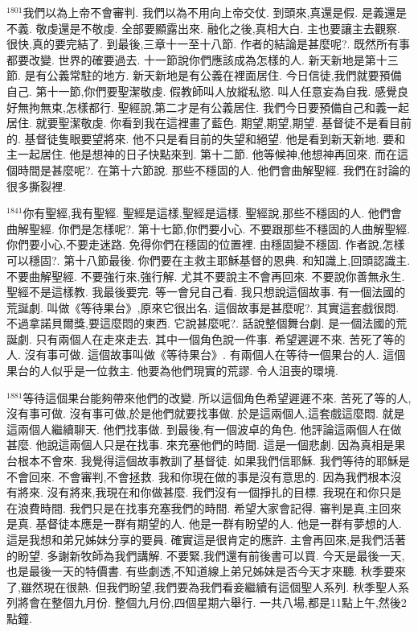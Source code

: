 \documentclass{book}
\begin{document}
$^{1801}$我們以為上帝不會審判.
我們以為不用向上帝交仗.
到頭來,真還是假.
是義還是不義.
敬虔還是不敬虔.
全部要顯露出來.
融化之後,真相大白.
主也要讓主去觀察.
很快,真的要完結了.
到最後,三章十一至十八節.
作者的結論是甚麼呢?.
既然所有事都要改變.
世界的確要過去.
十一節說你們應該成為怎樣的人.
新天新地是第十三節.
是有公義常駐的地方.
新天新地是有公義在裡面居住.
今日信徒,我們就要預備自己.
第十一節,你們要聖潔敬虔.
假教師叫人放縱私慾.
叫人任意妄為自我.
感覺良好無拘無束,怎樣都行.
聖經說,第二才是有公義居住.
我們今日要預備自己和義一起居住.
就要聖潔敬虔.
你看到我在這裡畫了藍色.
期望,期望,期望.
基督徒不是看目前的.
基督徒隻眼要望將來.
他不只是看目前的失望和絕望.
他是看到新天新地.
要和主一起居住.
他是想神的日子快點來到.
第十二節.
他等候神,他想神再回來.
而在這個時間是甚麼呢?.
在第十六節說.
那些不穩固的人.
他們會曲解聖經.
我們在討論的很多撕裂裡.

$^{1841}$你有聖經,我有聖經.
聖經是這樣,聖經是這樣.
聖經說,那些不穩固的人.
他們會曲解聖經.
你們是怎樣呢?.
第十七節,你們要小心.
不要跟那些不穩固的人曲解聖經.
你們要小心,不要走迷路.
免得你們在穩固的位置裡.
由穩固變不穩固.
作者說,怎樣可以穩固?.
第十八節最後.
你們要在主救主耶穌基督的恩典.
和知識上,回頭認識主.
不要曲解聖經.
不要強行來,強行解.
尤其不要說主不會再回來.
不要說你善無永生.
聖經不是這樣教.
我最後要完.
等一會兒自己看.
我只想說這個故事.
有一個法國的荒誕劇.
叫做《等待果台》,原來它很出名.
這個故事是甚麼呢?.
其實這套戲很悶.
不過拿諾貝爾獎,要這麼悶的東西.
它說甚麼呢?.
話說整個舞台劇.
是一個法國的荒誕劇.
只有兩個人在走來走去.
其中一個角色說一件事.
希望遲遲不來.
苦死了等的人.
沒有事可做.
這個故事叫做《等待果台》.
有兩個人在等待一個果台的人.
這個果台的人似乎是一位救主.
他要為他們現實的荒謬.
令人沮喪的環境.

$^{1881}$等待這個果台能夠帶來他們的改變.
所以這個角色希望遲遲不來.
苦死了等的人,沒有事可做.
沒有事可做,於是他們就要找事做.
於是這兩個人,這套戲這麼悶.
就是這兩個人繼續聊天.
他們找事做.
到最後,有一個波卓的角色.
他評論這兩個人在做甚麼.
他說這兩個人只是在找事.
來充塞他們的時間.
這是一個悲劇.
因為真相是果台根本不會來.
我覺得這個故事教訓了基督徒.
如果我們信耶穌.
我們等待的耶穌是不會回來.
不會審判,不會拯救.
我和你現在做的事是沒有意思的.
因為我們根本沒有將來.
沒有將來,我現在和你做甚麼.
我們沒有一個掙扎的目標.
我現在和你只是在浪費時間.
我們只是在找事充塞我們的時間.
希望大家會記得.
審判是真,主回來是真.
基督徒本應是一群有期望的人.
他是一群有盼望的人.
他是一群有夢想的人.
這是我想和弟兄姊妹分享的要員.
確實這是很肯定的應許.
主會再回來,是我們活著的盼望.
多謝新牧師為我們講解.
不要緊,我們還有前後書可以買.
今天是最後一天,也是最後一天的特價書.
有些劇透,不知道線上弟兄姊妹是否今天才來聽.
秋季要來了,雖然現在很熱.
但我們盼望,我們要為我們看妾繼續有這個聖人系列.
秋季聖人系列將會在整個九月份.
整個九月份,四個星期六舉行.
一共八場,都是11點上午,然後2點鐘.
\end{document}
